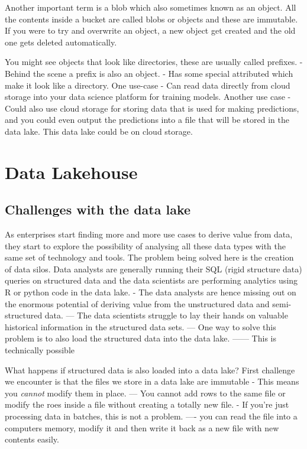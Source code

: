 \documentclass[a4paper, 11pt]{article}
\begin{document}
    Another important term is a blob which also sometimes known as an object.
    All the contents inside a bucket are called blobs or objects and these are immutable.
    If you were to try and overwrite an object, a new object get created and the old one gets deleted automatically.

    You might see objects that look like directories, these are usually called prefixes.
    - Behind the scene a prefix is also an object.
    - Has some special attributed which make it look like a directory.
    One use-case
    - Can read data directly from cloud storage into your data science platform for training models.
    Another use case
    - Could also use cloud storage for storing data that is used for making predictions, and you could even output the predictions into a file that will be stored in the data lake.
    This data lake could be on cloud storage.

    \section{Data Lakehouse}
    
    \subsection{Challenges with the data lake}

    As enterprises start finding more and more use cases to derive value from data, they start to explore the possibility of analysing all these data types with the same set of technology and tools.
    The problem being solved here is the creation of data silos.
    Data analysts are generally running their SQL (rigid structure data) queries on structured data and the data scientists are performing analytics using R or python code in the data lake.
    - The data analysts are hence missing out on the enormous potential of deriving value from the unstructured data and semi-structured data.
    --- The data scientists struggle to lay their hands on valuable historical information in the structured data sets.
    --- One way to solve this problem is to also load the structured data into the data lake.
    ------ This is technically possible

    What happens if structured data is also loaded into a data lake?
    First challenge we encounter is that the files we store in a data lake are immutable
    - This means you \textit{cannot} modify them in place.
    --- You cannot add rows to the same file or modify the roes inside a file without creating a totally new file.
    - If you're just processing data in batches, this is not a problem.
    ---- you can read the file into a computers memory, modify it and then write it back as a new file with new contents easily.
\end{document}
